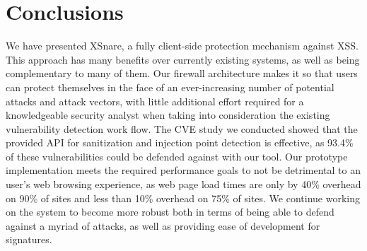 \section{Conclusions}
We have presented XSnare, a fully client-side protection mechanism against XSS. This approach has many benefits over currently existing systems, as well as being complementary to many of them. Our firewall architecture makes it so that users can protect themselves in the face of an ever-increasing number of potential attacks and attack vectors, with little additional effort required for a knowledgeable security analyst when taking into consideration the existing vulnerability detection work flow. The CVE study we conducted showed that the provided API for sanitization and injection point detection is effective, as 93.4\% of these vulnerabilities could be defended against with our tool. Our prototype implementation meets the required performance goals to not be detrimental to an user's web browsing experience, as web page load times are only by 40\% overhead on 90\% of sites and less than 10\% overhead on 75\% of sites. We continue working on the system to become more robust both in terms of being able to defend against a myriad of attacks, as well as providing ease of development for signatures. 
